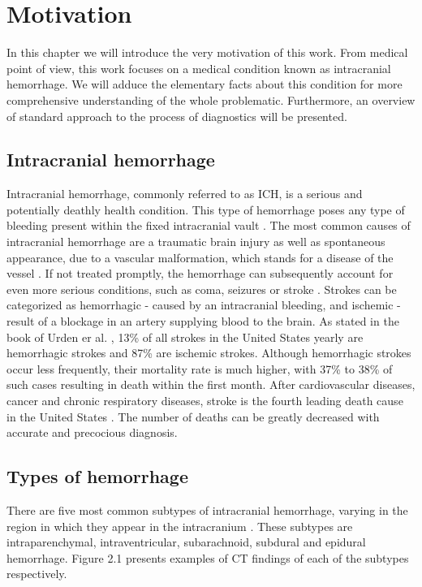 \chapter{Motivation}

In this chapter we will introduce the very motivation of this work. From medical point of view, this work focuses on a medical condition known as intracranial hemorrhage. We will adduce the elementary facts about this condition for more comprehensive understanding of the whole problematic. Furthermore, an overview of standard approach to the process of diagnostics will be presented.

\section{Intracranial hemorrhage}
Intracranial hemorrhage, commonly referred to as ICH, is a serious and potentially deathly health condition. This type of hemorrhage poses any type of bleeding present within the fixed intracranial vault \cite{intracranial1}. The most common causes of intracranial hemorrhage are a traumatic brain injury as well as spontaneous appearance, due to a vascular malformation, which stands for a disease of the vessel \cite{intracranial2}. If not treated promptly, the hemorrhage can subsequently account for even more serious conditions, such as coma, seizures or stroke \cite{intracranial2}. Strokes can be categorized as hemorrhagic - caused by an intracranial bleeding, and ischemic - result of a blockage in an artery supplying blood to the brain. As stated in the book of Urden er al. \cite{ICHbookstats}, 13\% of all strokes in the United States yearly are hemorrhagic strokes and 87\% are ischemic strokes. Although hemorrhagic strokes occur less frequently, their mortality rate is much higher, with 37\% to 38\% of such cases resulting in death within the first month. After cardiovascular diseases, cancer and chronic respiratory diseases, stroke is the fourth leading death cause in the United States \cite{ICHbookstats}. The number of deaths can be greatly decreased with accurate and precocious diagnosis.

\section{Types of hemorrhage}
There are five most common subtypes of intracranial hemorrhage, varying in the region in which they appear in the intracranium \cite{ICHsubtypes-CT, imagingICH}. These subtypes are intraparenchymal, intraventricular, subarachnoid, subdural and epidural hemorrhage. Figure 2.1 presents examples of CT findings of each of the subtypes respectively.

